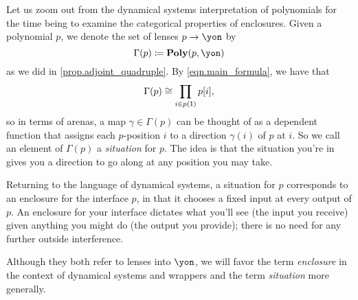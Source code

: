 \documentclass[Book-Poly]{subfiles}
\begin{document}
Let us zoom out from the dynamical systems interpretation of polynomials for the time being to examine the categorical properties of enclosures.
Given a polynomial $p$, we denote the set of lenses $p\to\yon$ by
\begin{equation} \label{eqn.gamma_def}
\Gamma(p)\coloneqq\poly(p,\yon)
\end{equation}
as we did in \cref{prop.adjoint_quadruple}.
By \eqref{eqn.main_formula}, we have that
\begin{equation} \label{eqn.gamma_prod}
    \Gamma(p) \cong \prod_{i \in p(\textsf{1})} p[i],
\end{equation}
so in terms of arenas, a map $\gamma\in\Gamma(p)$ can be thought of as a dependent function that assigns each $p$-position $i$ to a direction $\gamma(i)$ of $p$ at $i$.
So we call an element of $\Gamma(p)$ a \emph{situation} for $p$.
The idea is that the situation you're in gives you a direction to go along at any position you may take.

Returning to the language of dynamical systems, a situation for $p$ corresponds to an enclosure for the interface $p$, in that it chooses a fixed input at every output of $p$.
An enclosure for your interface dictates what you'll see (the input you receive) given anything you might do (the output you provide); there is no need for any further outside interference.

\begin{remark}
Although they both refer to lenses into $\yon$, we will favor the term \emph{enclosure} in the context of dynamical systems and wrappers and the term \emph{situation} more generally.
\end{remark}
\end{document}
